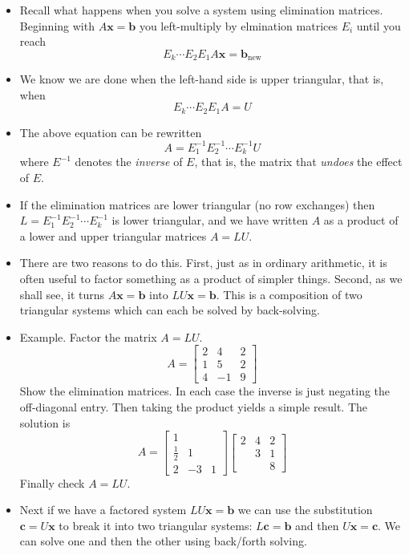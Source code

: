 \documentclass[11pt,oneside]{amsbook}
\theoremstyle{definition}
\theoremstyle{plain}
\theoremstyle{definition}
\theoremstyle{remark}
\numberwithin{equation}{section}
\numberwithin{figure}{section}
\begin{document}
\begin{itemize}
\item Recall what happens when you solve a system using elimination matrices. Beginning with $A\mathbf{x}=\mathbf{b}$ you left-multiply by elmination matrices $E_i$ until you reach
  \[E_k\cdots E_2E_1A\mathbf{x}=\mathbf{b}_{\mathrm{new}}
  \]
\item We know we are done when the left-hand side is upper triangular, that is, when
  \[E_k\cdots E_2E_1A=U
  \]
\item The above equation can be rewritten
  \[A=E_1^{-1}E_2^{-1}\cdots E_k^{-1}U
  \]
  where $E^{-1}$ denotes the \emph{inverse} of $E$, that is, the matrix that \emph{undoes} the effect of $E$.
\item If the elimination matrices are lower triangular (no row exchanges) then $L=E_1^{-1}E_2^{-1}\cdots E_k^{-1}$ is lower triangular, and we have written $A$ as a product of a lower and upper triangular matrices $A=LU$.
\item There are two reasons to do this. First, just as in ordinary arithmetic, it is often useful to factor something as a product of simpler things. Second, as we shall see, it turns $A\mathbf{x}=\mathbf{b}$ into $LU\mathbf{x}=\mathbf{b}$. This is a composition of two triangular systems which can each be solved by back-solving.
\item Example. Factor the matrix $A=LU$.
  \[A=\begin{bmatrix}2&4&2\\1&5&2\\4&-1&9\end{bmatrix}
  \]
  Show the elimination matrices. In each case the inverse is just negating the off-diagonal entry. Then taking the product yields a simple result. The solution is
  \[A=\begin{bmatrix}1&&\\\frac12&1&\\2&-3&1\end{bmatrix}
    \begin{bmatrix}2&4&2\\&3&1\\&&8\end{bmatrix}
  \]
  Finally check $A=LU$.
\item Next if we have a factored system $LU\mathbf{x}=\mathbf{b}$ we can use the substitution $\mathbf{c}=U\mathbf{x}$ to break it into two triangular systems: $L\mathbf{c}=\mathbf{b}$ and then $U\mathbf{x}=\mathbf{c}$. We can solve one and then the other using back/forth solving.

\end{itemize}
\end{document}

